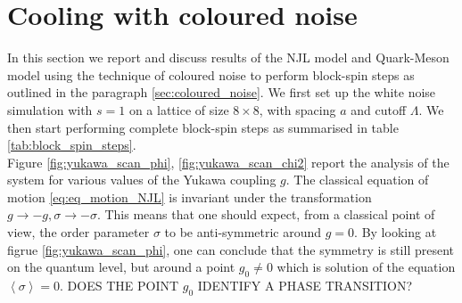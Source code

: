 \section{Cooling with coloured noise}
In this section we report and discuss results of the NJL model and Quark-Meson model using the technique of coloured noise to perform block-spin steps as outlined in the paragraph \ref{sec:coloured_noise}. We first set up the white noise simulation with $s=1$ on a lattice of size $8 \times 8$, with spacing $a$ and cutoff $\Lambda$. We then start performing complete block-spin steps as summarised in table \ref{tab:block_spin_steps}. \\

Figure \ref{fig:yukawa_scan_phi}, \ref{fig:yukawa_scan_chi2} report the analysis of the system for various values of the Yukawa coupling $g$. The classical equation of motion \eqref{eq:eq_motion_NJL} is invariant under the transformation $g \to -g, \sigma \to -\sigma$. This means that one should expect, from a classical point of view, the order parameter $\sigma$ to be anti-symmetric around $g = 0$. By looking at figrue \ref{fig:yukawa_scan_phi}, one can conclude that the symmetry is still present on the quantum level, but around a point $g_0 \neq 0$ which is solution of the equation $\left\langle \sigma \right\rangle = 0$. DOES THE POINT $g_0$ IDENTIFY A PHASE TRANSITION?

